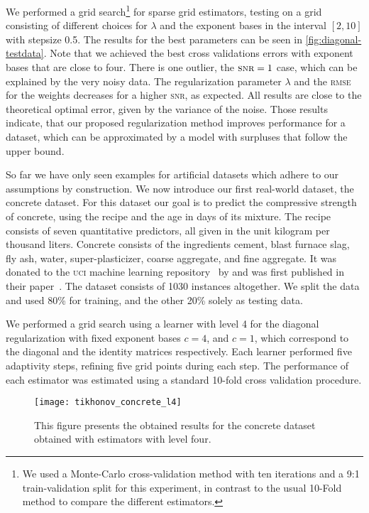 We performed a grid search\footnote{
We used a Monte-Carlo cross-validation method with ten iterations and
a 9:1 train-validation split for this experiment, in contrast to the usual
10-Fold method to compare the different estimators.
} for sparse grid estimators, testing on a grid
consisting of different choices for \(\lambda\) and the exponent bases in the
interval \([2, 10]\) with stepsize 0.5.
The results for the best parameters can be seen in \cref{fig:diagonal-testdata}.
Note that we achieved the best cross validations errors with exponent bases
that are close to four.
There is one outlier, the \(\textsc{snr} = 1\) case, which can be explained
by the very noisy data.
The regularization parameter \(\lambda\) and the \textsc{rmse} for the weights
decreases for a higher \textsc{snr}, as expected.
All results are close to the theoretical optimal error, given by the variance of
the noise.
Those results indicate, that our proposed regularization method improves performance for a dataset, which can be approximated by a model with surpluses that follow the upper bound.

So far we have only seen examples for artificial datasets which adhere to our assumptions by construction.
We now introduce our first real-world dataset, the concrete dataset.
For this dataset our goal is to predict the compressive strength of concrete,
using the recipe and the age in days of its mixture.
The recipe consists of seven quantitative predictors, all given in the unit
kilogram per thousand liters.
Concrete consists of the ingredients cement, blast furnace slag, fly ash,
water, super-plasticizer, coarse aggregate, and fine aggregate.
It was donated to the \textsc{uci} machine learning
repository~\cite{datasets-uci} by \citeauthor{datasets-concrete} and was first
published in their paper~\cite{datasets-concrete}.
The dataset consists of 1030 instances altogether.
We split the data and used 80\% for training, and the other 20\% solely as
testing data.

We performed a grid search using a learner with level 4 for the diagonal
regularization with fixed exponent bases \(c = 4\), and \(c = 1\), which
correspond to the diagonal and the identity matrices respectively.
Each learner performed five adaptivity steps, refining five grid points during
each step.
The performance of each estimator was estimated using a standard 10-fold cross
validation procedure.

\begin{figure}[htb]
  \centering
  \texttt{[image: tikhonov\_concrete\_l4]}
  \caption{This figure presents the obtained results for the concrete dataset
    obtained with estimators with level four.}
  \label{fig:tikhonov-concrete-l4}
\end{figure}

